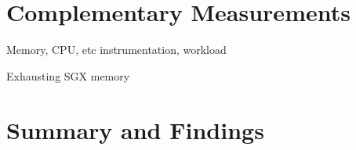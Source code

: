 \section{Complementary Measurements}
\label{sec:complementary_measurements}

Memory, CPU, etc instrumentation, workload

Exhausting SGX memory

\section{ Summary and Findings}
\label{sec:summary_and_findings}












